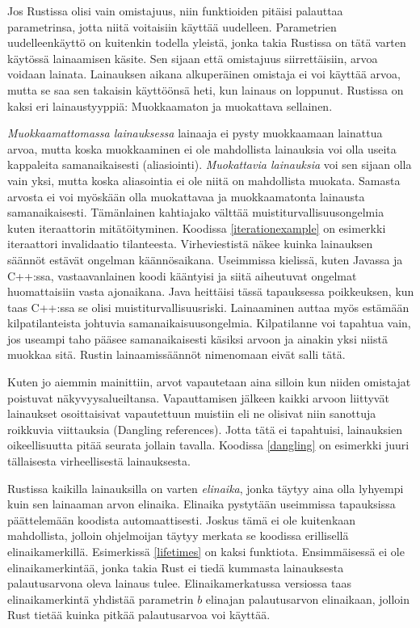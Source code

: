 \documentclass[finnish]{tktltiki2}
\theoremstyle{definition}
\theoremstyle{remark}
\begin{document}
Jos Rustissa olisi vain omistajuus, niin funktioiden pitäisi palauttaa parametrinsa, jotta niitä voitaisiin käyttää uudelleen. Parametrien uudelleenkäyttö on kuitenkin todella yleistä, jonka takia Rustissa on tätä varten käytössä lainaamisen käsite. Sen sijaan että omistajuus siirrettäisiin, arvoa voidaan lainata. Lainauksen aikana alkuperäinen omistaja ei voi käyttää arvoa, mutta se saa sen takaisin käyttöönsä heti, kun lainaus on loppunut. Rustissa on kaksi eri lainaustyyppiä: Muokkaamaton ja muokattava sellainen.

\textit{Muokkaamattomassa lainauksessa} lainaaja ei pysty muokkaamaan lainattua arvoa, mutta koska muokkaaminen ei ole mahdollista lainauksia voi olla useita kappaleita samanaikaisesti (aliasiointi). \textit{Muokattavia lainauksia} voi sen sijaan olla vain yksi, mutta koska aliasointia ei ole niitä on mahdollista muokata. Samasta arvosta ei voi myöskään olla muokattavaa ja muokkaamatonta lainausta samanaikaisesti. Tämänlainen kahtiajako välttää muistiturvallisuusongelmia kuten iteraattorin mitätöityminen. Koodissa \ref{iterationexample} on esimerkki iteraattori invalidaatio tilanteesta. Virheviestistä näkee kuinka lainauksen säännöt estävät ongelman käännösaikana. Useimmissa kielissä, kuten Javassa ja C++:ssa, vastaavanlainen koodi kääntyisi ja siitä aiheutuvat ongelmat huomattaisiin vasta ajonaikana. Java heittäisi tässä tapauksessa poikkeuksen, kun taas C++:ssa se olisi muistiturvallisuusriski. Lainaaminen auttaa myös estämään kilpatilanteista johtuvia samanaikaisuusongelmia. Kilpatilanne voi tapahtua vain, jos useampi taho pääsee samanaikaisesti käsiksi arvoon ja ainakin yksi niistä muokkaa sitä. Rustin lainaamissäännöt nimenomaan eivät salli tätä.

Kuten jo aiemmin mainittiin, arvot vapautetaan aina silloin kun niiden omistajat poistuvat näkyvyysalueiltansa. Vapauttamisen jälkeen kaikki arvoon liittyvät lainaukset osoittaisivat vapautettuun muistiin eli ne olisivat niin sanottuja roikkuvia viittauksia (Dangling references). Jotta tätä ei tapahtuisi, lainauksien oikeellisuutta pitää seurata jollain tavalla. Koodissa \ref{dangling} on esimerkki juuri tällaisesta virheellisestä lainauksesta.

Rustissa kaikilla lainauksilla on varten \textit{elinaika}, jonka täytyy aina olla lyhyempi kuin sen lainaaman arvon elinaika. Elinaika pystytään useimmissa tapauksissa päättelemään koodista automaattisesti. Joskus tämä ei ole kuitenkaan mahdollista, jolloin ohjelmoijan täytyy merkata se koodissa erillisellä elinaikamerkillä. Esimerkissä \ref{lifetimes} on kaksi funktiota. Ensimmäisessä ei ole elinaikamerkintää, jonka takia Rust ei tiedä kummasta lainauksesta palautusarvona oleva lainaus tulee. Elinaikamerkatussa versiossa taas elinaikamerkintä yhdistää parametrin $b$ elinajan palautusarvon elinaikaan, jolloin Rust tietää kuinka pitkää palautusarvoa voi käyttää.
\end{document}
